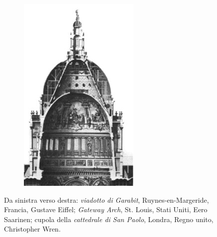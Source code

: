 \documentclass{article}
\begin{document}
\begin{figure}[h!]
\begin{subfigure}[b]{0.3\linewidth}
        \includegraphics[width=\linewidth]{extra/cupola_cattedrale_san_paolo.jpg} 
    \end{subfigure}
    \caption{Da sinistra verso destra: \emph{viadotto di Garabit}, Ruynes-en-Margeride, Francia, Gustave Eiffel; \emph{Gateway Arch}, St. Louis, Stati Uniti, Eero Saarinen; cupola della \emph{cattedrale di San Paolo}, Londra, Regno unito, Christopher Wren.}
    \label{fig:applicazioni}
\end{figure}
\end{document}
